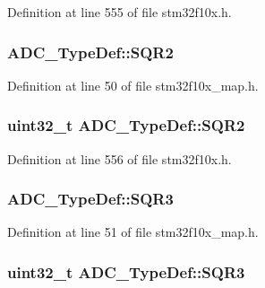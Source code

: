Definition at line 555 of file stm32f10x.\+h.

\subsubsection[{\texorpdfstring{S\+Q\+R2}{SQR2}}]{ A\+D\+C\+\_\+\+Type\+Def\+::\+S\+Q\+R2}\hypertarget{struct_a_d_c___type_def_a49092ad72947aa5a22f544814039b28b}{}\label{struct_a_d_c___type_def_a49092ad72947aa5a22f544814039b28b}


Definition at line 50 of file stm32f10x\+\_\+map.\+h.

\subsubsection[{\texorpdfstring{S\+Q\+R2}{SQR2}}]{ {\bf uint32\+\_\+t} A\+D\+C\+\_\+\+Type\+Def\+::\+S\+Q\+R2}\hypertarget{struct_a_d_c___type_def_a6b6e55e6c667042e5a46a76518b73d5a}{}\label{struct_a_d_c___type_def_a6b6e55e6c667042e5a46a76518b73d5a}


Definition at line 556 of file stm32f10x.\+h.

\subsubsection[{\texorpdfstring{S\+Q\+R3}{SQR3}}]{ A\+D\+C\+\_\+\+Type\+Def\+::\+S\+Q\+R3}\hypertarget{struct_a_d_c___type_def_af12f17607124a87a06ea88d76c804e91}{}\label{struct_a_d_c___type_def_af12f17607124a87a06ea88d76c804e91}


Definition at line 51 of file stm32f10x\+\_\+map.\+h.

\subsubsection[{\texorpdfstring{S\+Q\+R3}{SQR3}}]{ {\bf uint32\+\_\+t} A\+D\+C\+\_\+\+Type\+Def\+::\+S\+Q\+R3}\hypertarget{struct_a_d_c___type_def_a51dbdba74c4d3559157392109af68fc6}{}\label{struct_a_d_c___type_def_a51dbdba74c4d3559157392109af68fc6}


